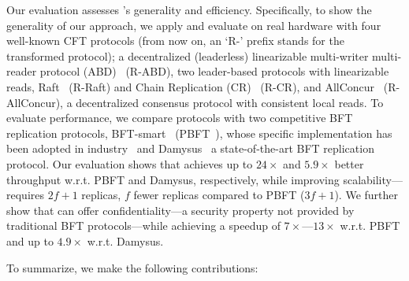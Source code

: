 Our evaluation assesses \projecttitle{}'s generality and efficiency. Specifically, to show the generality of our approach, we apply and evaluate \projecttitle{} on real hardware with four well-known CFT protocols (from now on, an `R-' prefix stands for the transformed protocol); a decentralized (leaderless) linearizable multi-writer multi-reader protocol (ABD)~\cite{lynch:1997} (R-ABD), two leader-based protocols with linearizable reads, Raft~\cite{raft} (R-Raft) and Chain Replication (CR)~\cite{chain-replication} (R-CR), and AllConcur~\cite{Poke2016AllConcurLC} (R-AllConcur), a decentralized consensus protocol with consistent local reads. To evaluate performance, we compare \projecttitle{} protocols with two competitive BFT replication protocols, BFT-smart~\cite{bft-smart} (PBFT~\cite{Castro2002}), whose specific implementation has been adopted in industry~\cite{bftsmarthyperledger} and Damysus~\cite{10.1145/3492321.3519568} a state-of-the-art BFT replication protocol.  Our evaluation shows that \projecttitle{} achieves up to $24\times$ and $5.9\times$ better throughput w.r.t. PBFT and Damysus, respectively, while improving scalability---\projecttitle{} requires $2f+1$ replicas, $f$ fewer replicas compared to PBFT ($3f+1$). We further show that \projecttitle{} can offer confidentiality---a security property not provided by traditional BFT protocols---while achieving a speedup of $7\times$---$13\times$ w.r.t. PBFT and up to $4.9\times$ w.r.t. Damysus.



To summarize, we make the following contributions:

